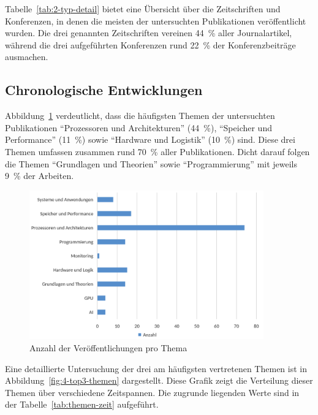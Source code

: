 Tabelle~\ref{tab:2-typ-detail} bietet eine Übersicht über die Zeitschriften und Konferenzen, in denen die meisten der untersuchten Publikationen veröffentlicht wurden. Die drei genannten Zeitschriften vereinen 44~\% aller Journalartikel, während die drei aufgeführten Konferenzen rund 22~\% der Konferenzbeiträge ausmachen.

\subsection{Chronologische Entwicklungen}
Abbildung~\ref{fig:3-anzahl-themen} verdeutlicht, dass die häufigsten Themen der untersuchten Publikationen \enquote{Prozessoren und Architekturen} (44~\%), \enquote{Speicher und Performance} (11~\%) sowie \enquote{Hardware und Logistik} (10~\%) sind. Diese drei Themen umfassen zusammen rund 70~\% aller Publikationen. Dicht darauf folgen die Themen \enquote{Grundlagen und Theorien} sowie \enquote{Programmierung} mit jeweils 9~\% der Arbeiten.

\begin{figure}[!h]
    \centering
    \includegraphics[width=0.90\textwidth]{graphics_lit/3-thema.png}
    \caption{Anzahl der Veröffentlichungen pro Thema}
    \label{fig:3-anzahl-themen}
\end{figure}

Eine detaillierte Untersuchung der drei am häufigsten vertretenen Themen ist in Abbildung~\ref{fig:4-top3-themen} dargestellt. Diese Grafik zeigt die Verteilung dieser Themen über verschiedene Zeitspannen. Die zugrunde liegenden Werte sind in der Tabelle~\ref{tab:themen-zeit} aufgeführt.

